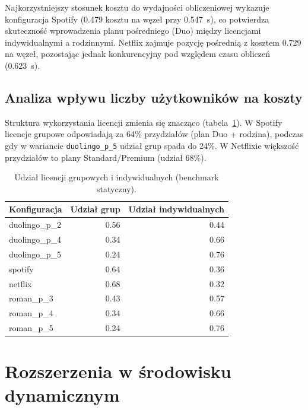 Najkorzystniejszy stosunek kosztu do wydajności obliczeniowej wykazuje konfiguracja Spotify (0.479 kosztu na węzeł przy 0.547~s), co potwierdza skuteczność wprowadzenia planu pośredniego (Duo) między licencjami indywidualnymi a rodzinnymi. Netflix zajmuje pozycję pośrednią z kosztem 0.729 na węzeł, pozostając jednak konkurencyjny pod względem czasu obliczeń (0.623~s).

\subsection{Analiza wpływu liczby użytkowników na koszty}

Struktura wykorzystania licencji zmienia się znacząco (tabela~\ref{tab:ext-license-mix}). W Spotify licencje grupowe odpowiadają za 64\% przydziałów (plan Duo + rodzina), podczas gdy w wariancie \texttt{duolingo\_p\_5} udział grup spada do 24\%. W Netflixie większość przydziałów to plany Standard/Premium (udział 68\%).

\begin{table}[H]
  \centering
  \caption{Udział licencji grupowych i indywidualnych (benchmark statyczny).}
  \label{tab:ext-license-mix}
  \begin{tabular}{lrr}
    \toprule
    \textbf{Konfiguracja} & \textbf{Udział grup} & \textbf{Udział indywidualnych} \\
    \midrule
    duolingo\_p\_2        & 0.56                 & 0.44                           \\
    duolingo\_p\_4        & 0.34                 & 0.66                           \\
    duolingo\_p\_5        & 0.24                 & 0.76                           \\
    spotify               & 0.64                 & 0.36                           \\
    netflix               & 0.68                 & 0.32                           \\
    roman\_p\_3           & 0.43                 & 0.57                           \\
    roman\_p\_4           & 0.34                 & 0.66                           \\
    roman\_p\_5           & 0.24                 & 0.76                           \\
    \bottomrule
  \end{tabular}
\end{table}


\section{Rozszerzenia w środowisku dynamicznym}

